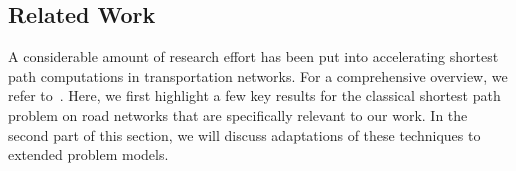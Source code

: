 \documentclass[manuscript]{acmart}
\begin{document}

\subsection{Related Work}\label{sec:related_work}

A considerable amount of research effort has been put into accelerating shortest path computations in transportation networks.
For a comprehensive overview, we refer to~\cite{bdgmpsww-rptn-16}.
Here, we first highlight a few key results for the classical shortest path problem on road networks that are specifically relevant to our work.
In the second part of this section, we will discuss adaptations of these techniques to extended problem models.
\end{document}
